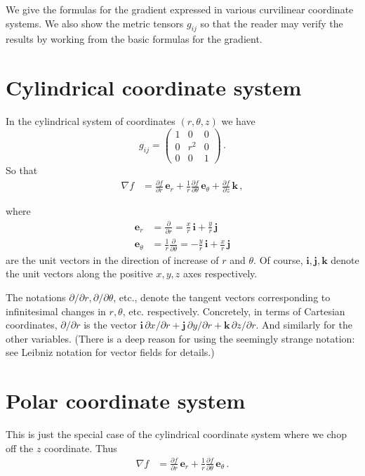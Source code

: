 \documentclass[12pt]{article}
\newcommand{\vi}{\mathbf{i}}
\newcommand{\vj}{\mathbf{j}}
\newcommand{\vk}{\mathbf{k}}
\newcommand{\ve}{\mathbf{e}}
\begin{document}
We give the formulas for the gradient expressed in various curvilinear coordinate systems.
We also show the metric tensors $g_{ij}$ so
that the reader may verify the results
by working from the basic formulas for the gradient.
\tableofcontents

\section{Cylindrical coordinate system}
In the
cylindrical system of coordinates $(r,\theta, z)$ we have
\[
g_{ij} =
\begin{pmatrix}
1 &0&0\\ 0&r^2&0\\ 0&0&1
\end{pmatrix}\,.
\]
So that
\begin{align*}
\nabla f 
&= \frac{\partial f}{\partial r}\,\ve_r +
\frac{1}{r}\frac{\partial f}{\partial\theta}\,\ve_\theta +
\frac{\partial f}{\partial z}\,\vk\,,
\end{align*}

where
\begin{align*}
\ve_r &= \frac{\partial}{\partial r} =
\frac{x}{r}\, \vi + \frac{y}{r}\, \vj \\
\ve_\theta &= \frac{1}{r}\frac{\partial}{\partial \theta} =
-\frac{y}{r}\, \vi + \frac{x}{r}\, \vj
\end{align*}
are the unit vectors in the direction of increase of $r$ and $\theta$.  Of course,
$\vi, \vj, \vk$ denote the unit vectors along the positive $x, y, z$ axes respectively.

The notations $\partial/\partial r, \partial/\partial \theta$, etc.,
denote the tangent vectors corresponding to infinitesimal changes in $r, \theta$, etc. respectively.
Concretely, in terms of Cartesian coordinates, $\partial/\partial r$
is the vector $\vi \, \partial x/\partial r + \vj \, \partial y/\partial r + \vk \, \partial z/\partial r$.
And similarly for the other variables.  (There is a deep reason for using the seemingly strange notation:
see Leibniz notation for vector fields for details.)


\section{Polar coordinate system}
This is just the special case of the cylindrical coordinate system where we chop off the $z$ coordinate.
Thus
\begin{align*}
\nabla f &= \frac{\partial f}{\partial r} \, \ve_r + \frac{1}{r} \frac{\partial f}{\partial \theta} \, \ve_\theta\,.
\end{align*}
\end{document}
